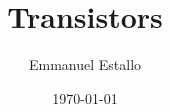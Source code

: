 \documentclass{article}
\title{Transistors}
\author{Emmanuel Estallo}
\date{\today}
\begin{document}
\maketitle 
\noindent 
\end{document}

